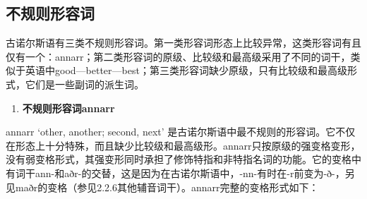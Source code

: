 \subsection{不规则形容词}\label{ux4e0dux89c4ux5219ux5f62ux5bb9ux8bcd}

古诺尔斯语有三类不规则形容词。第一类形容词形态上比较异常，这类形容词有且仅有一个：annarr；第二类形容词的原级、比较级和最高级采用了不同的词干，类似于英语中good---better---best；第三类形容词缺少原级，只有比较级和最高级形式，它们是一些副词的派生词。

\begin{enumerate}
  \def\labelenumi{\arabic{enumi})}
  \item
        \textbf{不规则形容词annarr}
\end{enumerate}

annarr `other, another; second, next‌'
是古诺尔斯语中最不规则的形容词。它不仅在形态上十分特殊，而且缺少比较级和最高级形。annarr只按原级的强变格变形，没有弱变格形式，其强变形同时承担了修饰特指和非特指名词的功能。它的变格中有词干ann-和aðr-的交替，这是因为在古诺尔斯语中，-nn-有时在-r前变为-ð-，另见maðr的变格（参见2.2.6其他辅音词干）。annarr完整的变格形式如下：

